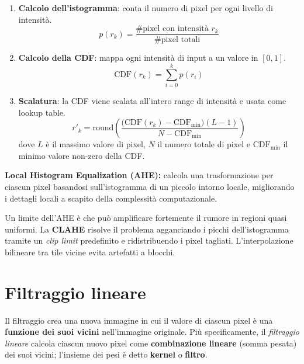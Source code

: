 \documentclass[12pt, a4paper]{report}
\begin{document}
\begin{enumerate}
  \item \textbf{Calcolo dell'istogramma}: conta il numero di pixel per ogni livello
        di intensità.
        \[
          p(r_k) = \frac{\#\text{pixel con intensità }r_k}{\#\text{pixel totali}}
        \]

  \item \textbf{Calcolo della CDF}: mappa ogni intensità di input a un valore in
        $[0,1]$.
        \[
          \mathrm{CDF}(r_k) = \sum_{i=0}^{k} p(r_i)
        \]

  \item \textbf{Scalatura}: la CDF viene scalata all'intero range di intensità e
        usata come lookup table.
        \[
          r'_k = \mathrm{round}\!\left(
            \frac{\bigl(\mathrm{CDF}(r_k)-\mathrm{CDF}_{\min}\bigr)(L-1)}
                 {N - \mathrm{CDF}_{\min}}
          \right)
        \]
        dove $L$ è il massimo valore di pixel, $N$ il numero totale di pixel e
        $\mathrm{CDF}_{\min}$ il minimo valore non-zero della CDF.
\end{enumerate}

\textbf{Local Histogram Equalization (AHE):} calcola una trasformazione per ciascun
pixel basandosi sull'istogramma di un piccolo intorno locale, migliorando i dettagli
locali a scapito della complessità computazionale.

\begin{notebox}
Un limite dell'AHE è che può amplificare fortemente il rumore in regioni quasi
uniformi.  La \textbf{CLAHE} risolve il problema agganciando i picchi dell'istogramma
tramite un \emph{clip limit} predefinito e ridistribuendo i pixel tagliati.
L'interpolazione bilineare tra tile vicine evita artefatti a blocchi.
\end{notebox}

\section{Filtraggio lineare}

\begin{defbox}
Il filtraggio crea una nuova immagine in cui il valore di ciascun pixel è una
\textbf{funzione dei suoi vicini} nell'immagine originale.  Più specificamente, il
\emph{filtraggio lineare} calcola ciascun nuovo pixel come \textbf{combinazione
lineare} (somma pesata) dei suoi vicini; l'insieme dei pesi è detto \textbf{kernel}
o \textbf{filtro}.
\end{defbox}
\end{document}
